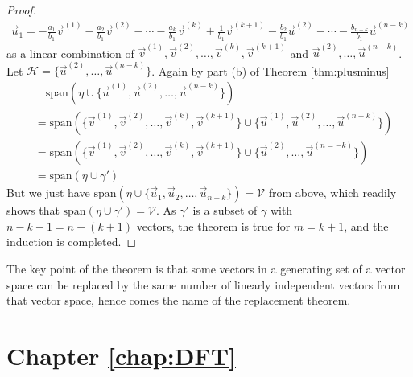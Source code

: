\begin{proof}
\begin{align*}
\vec{u}_1 = -\frac{a_1}{b_1}\vec{v}^{(1)} -\frac{a_2}{b_1}\vec{v}^{(2)} - \cdots - \frac{a_k}{b_1}\vec{v}^{(k)} + \frac{1}{b_1}\vec{v}^{(k+1)} - \frac{b_2}{b_1}\vec{u}^{(2)} - \cdots - \frac{b_{n-k}}{b_1}\vec{u}^{(n-k)}
\end{align*}
as a linear combination of $\vec{v}^{(1)}, \vec{v}^{(2)}, \ldots, \vec{v}^{(k)}, \vec{v}^{(k+1)}$ and $\vec{u}^{(2)}, \ldots, \vec{u}^{(n-k)}$. Let $\mathcal{H} = \{\vec{u}^{(2)}, \ldots, \vec{u}^{(n-k)}\}$. Again by part (b) of Theorem \ref{thm:plusminus}
\begin{align*}
&\quad \text{span}(\mathcal{\eta} \cup \{\vec{u}^{(1)}, \vec{u}^{(2)}, \ldots, \vec{u}^{(n-k)}\}) \\
&= \text{span}(\{\vec{v}^{(1)}, \vec{v}^{(2)}, \ldots, \vec{v}^{(k)}, \vec{v}^{(k+1)}\} \cup \{\vec{u}^{(1)}, \vec{u}^{(2)}, \ldots, \vec{u}^{(n-k)}\}) \\
&= \text{span}(\{\vec{v}^{(1)}, \vec{v}^{(2)}, \ldots, \vec{v}^{(k)}, \vec{v}^{(k+1)}\} \cup \{\vec{u}^{(2)}, \ldots, \vec{u}^{(n=-k)}\}) \\
&= \text{span}(\mathcal{\eta} \cup \mathcal{\gamma'})
\end{align*}
But we just have $\text{span}(\mathcal{\eta} \cup \{\vec{u}_1, \vec{u}_2, \ldots, \vec{u}_{n-k}\}) = \mathcal{V}$ from above, which readily shows that $\text{span}(\mathcal{\eta} \cup \mathcal{\gamma'}) = \mathcal{V}$. As $\mathcal{\gamma'}$ is a subset of $\mathcal{\gamma}$ with $n - k-1 = n - (k+1)$ vectors, the theorem is true for $m = k+1$, and the induction is completed.
\end{proof}
The key point of the theorem is that some vectors in a generating set of a vector space can be replaced by the same number of linearly independent vectors from that vector space, hence comes the name of the replacement theorem.

\section{Chapter \ref*{chap:DFT}}
\label{section:DFTappend}

